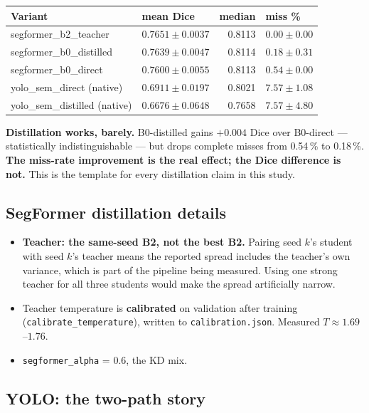 \documentclass[11pt]{article}
\begin{document}
\begin{center}
\begin{tabular}{LMnM}
\toprule
\textbf{Variant} & \textbf{mean Dice} & \textbf{median} & \textbf{miss \%} \\
\midrule
segformer\_b2\_teacher & $0.7651\pm0.0037$ & 0.8113 & $0.00\pm0.00$ \\
segformer\_b0\_distilled & $0.7639\pm0.0047$ & 0.8114 & $0.18\pm0.31$ \\
segformer\_b0\_direct & $0.7600\pm0.0055$ & 0.8113 & $0.54\pm0.00$ \\
yolo\_sem\_direct (native) & $0.6911\pm0.0197$ & 0.8021 & $7.57\pm1.08$ \\
yolo\_sem\_distilled (native) & $0.6676\pm0.0648$ & 0.7658 & $7.57\pm4.80$ \\
\bottomrule
\end{tabular}
\end{center}

\textbf{Distillation works, barely.} B0-distilled gains $+0.004$ Dice over
B0-direct --- statistically indistinguishable --- but drops complete misses from
0.54\,\% to 0.18\,\%. \textbf{The miss-rate improvement is the real effect; the
Dice difference is not.} This is the template for every distillation claim in
this study.

\subsection{SegFormer distillation details}

\begin{itemize}[leftmargin=*,itemsep=1pt]
\item \textbf{Teacher: the same-seed B2, not the best B2.} Pairing seed $k$'s
student with seed $k$'s teacher means the reported spread includes the teacher's
own variance, which is part of the pipeline being measured. Using one strong
teacher for all three students would make the spread artificially narrow.
\item Teacher temperature is \textbf{calibrated} on validation after training
(\texttt{calibrate\_temperature}), written to \texttt{calibration.json}.
Measured $T\approx1.69$--$1.76$.
\item \texttt{segformer\_alpha} = 0.6, the KD mix.
\end{itemize}

\subsection{YOLO: the two-path story}
\end{document}
